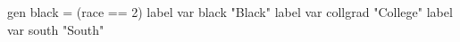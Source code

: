 gen black = (race == 2)
label var black "Black"
label var collgrad "College"
label var south "South"
